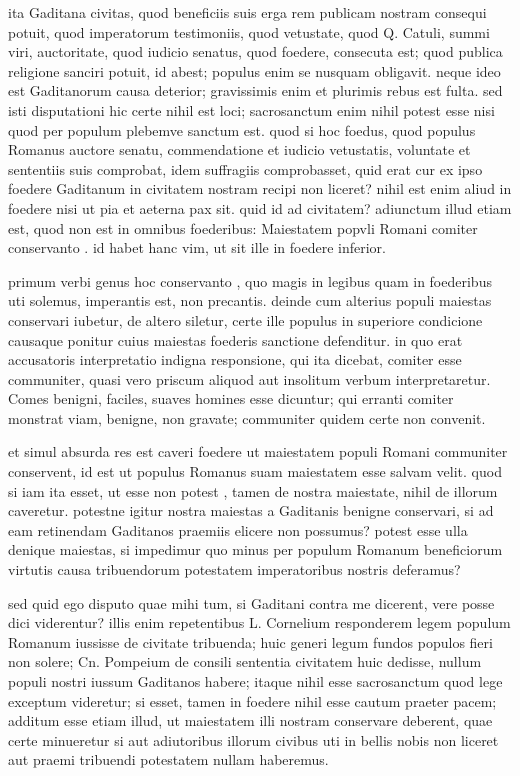  ita Gaditana civitas, quod beneficiis suis erga rem publicam nostram consequi potuit, quod imperatorum testimoniis, quod vetustate, quod Q. Catuli, summi viri, auctoritate, quod iudicio senatus, quod foedere, consecuta est; quod publica religione sanciri potuit, id abest; populus enim se nusquam obligavit. neque ideo est Gaditanorum causa deterior; gravissimis enim et plurimis rebus est fulta. sed isti disputationi hic certe nihil est loci; sacrosanctum enim nihil potest esse nisi quod per populum plebemve sanctum est. quod si hoc foedus, quod populus Romanus auctore senatu, commendatione et iudicio vetustatis, voluntate et sententiis suis comprobat, idem suffragiis comprobasset, quid erat cur ex ipso foedere Gaditanum in civitatem nostram recipi non liceret? nihil est enim aliud in foedere nisi ut pia et aeterna pax sit. quid id ad civitatem? adiunctum illud etiam est, quod non est in omnibus foederibus: Maiestatem popvli Romani comiter conservanto . id habet hanc vim, ut sit ille in foedere inferior.

 primum verbi genus hoc conservanto , quo magis in legibus quam in foederibus uti solemus, imperantis est, non precantis. deinde cum alterius populi maiestas conservari iubetur, de altero siletur, certe ille populus in superiore condicione causaque ponitur cuius maiestas foederis sanctione defenditur. in quo erat accusatoris interpretatio indigna responsione, qui ita dicebat, comiter esse communiter, quasi vero priscum aliquod aut insolitum verbum interpretaretur. Comes benigni, faciles, suaves homines esse dicuntur; qui erranti comiter monstrat viam, benigne, non gravate; communiter quidem certe non convenit.

 et simul absurda res est caveri foedere ut maiestatem populi Romani communiter conservent, id est ut populus Romanus suam maiestatem esse salvam velit. quod si iam ita esset, ut esse non potest , tamen de nostra maiestate, nihil de illorum caveretur. potestne igitur nostra maiestas a Gaditanis benigne conservari, si ad eam retinendam Gaditanos praemiis elicere non possumus? potest esse ulla denique maiestas, si impedimur quo minus per populum Romanum beneficiorum virtutis causa tribuendorum potestatem imperatoribus nostris deferamus?

 sed quid ego disputo quae mihi tum, si Gaditani contra me dicerent, vere posse dici viderentur? illis enim repetentibus L. Cornelium responderem legem populum Romanum iussisse de civitate tribuenda; huic generi legum fundos populos fieri non solere; Cn. Pompeium de consili sententia civitatem huic dedisse, nullum populi nostri iussum Gaditanos habere; itaque nihil esse sacrosanctum quod lege exceptum videretur; si esset, tamen in foedere nihil esse cautum praeter pacem; additum esse etiam illud, ut maiestatem illi nostram conservare deberent, quae certe minueretur si aut adiutoribus illorum civibus uti in bellis nobis non liceret aut praemi tribuendi potestatem nullam haberemus.

